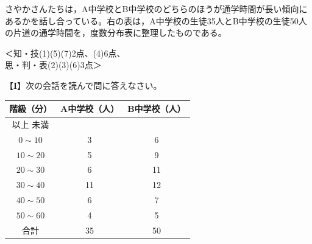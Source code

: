 \documentclass[
  12pt,a4paper,lualatex,ja=standard]{bxjsarticle}
\begin{document}
\begin{flushleft}
\begin{multicols}{2}
\setcounter{skaunta}{0}
\noindent{} \hspace{1pt}さやかさんたちは，A中学校とB中学校のどちらのほうが通学時間が長い傾向にあるかを話し合っている。右の表は，A中学校の生徒35人とB中学校の生徒50人の片道の通学時間を，度数分布表に整理したものである。

%
\begin{flushright}%
\footnotesize{＜知・技(1)(5)(7)2点、(4)6点、\\思・判・表(2)(3)(6)3点＞}%
\end{flushright}%


【$\mathbf{I}$】次の会話を読んで問に答えなさい。

\columnbreak

\begin{tabular}{|c|c|c|}
\hline
階級（分） & A中学校（人） & B中学校（人）\\
\hline
\footnotesize{以上}\phantom{$\sim$} \footnotesize{未満} & & \\
$0 \sim 10$  & 3 & 6 \\
$10 \sim 20$ & 5 & 9 \\
$20 \sim 30$ & 6 & 11 \\
$30 \sim 40$ & 11 & 12 \\
$40 \sim 50$ & 6 & 7 \\
$50 \sim 60$ & 4 & 5 \\
\hline
合計 & 35 & 50 \\
\hline

\end{tabular}

\end{multicols}


\end{flushleft}
\end{document}
